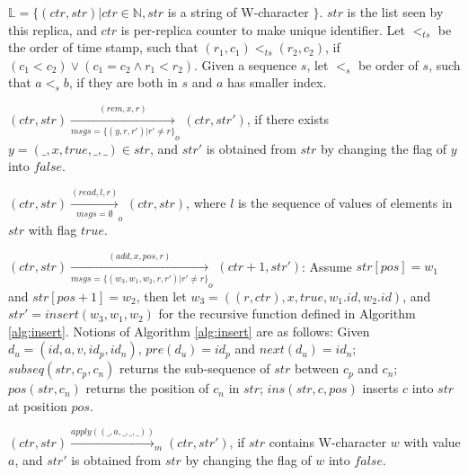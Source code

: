 \begin{itemize}
\setlength{\itemsep}{0.5pt}
\item[-] $\mathbb{L} = \{ (\mathit{ctr}, \mathit{str}) \vert \mathit{ctr} \in \mathbb{N}, \mathit{str}$ is a string of W-character $\}$. $\mathit{str}$ is the list seen by this replica, and $\mathit{ctr}$ is per-replica counter to make unique identifier. Let $<_{\mathit{ts}}$ be the order of time stamp, such that $(r_1,c_1) <_{\mathit{ts}} (r_2,c_2)$, if $(c_1 < c_2) \vee (c_1 = c_2 \wedge r_1 < r_2)$. Given a sequence $s$, let $<_s$ be order of $s$, such that $a <_s b$, if they are both in $s$ and $a$ has smaller index.

{\color {red}
\item[-] $(\mathit{ctr},\mathit{str}) \xrightarrow[\mathit{msgs} = \{ (y,r,r') \vert r' \neq r \}]{(\mathit{rem},x,r)}_o (\mathit{ctr},\mathit{str}')$, if there exists $y = (\_,x,\textit{true},\_,\_) \in \mathit{str}$, and $\mathit{str}'$ is obtained from $\mathit{str}$ by changing the flag of $y$ into $\mathit{false}$.

\item[-] $(\mathit{ctr},\mathit{str}) \xrightarrow[\mathit{msgs} = \emptyset]{(\mathit{read},l,r)}_o (\mathit{ctr},\mathit{str})$, where $l$ is the sequence of values of elements in $\mathit{str}$ with flag $\mathit{true}$.

\item[-] $(\mathit{ctr},\mathit{str}) \xrightarrow[\mathit{msgs} = \{ (w_3,w_1,w_2,r,r') \vert r' \neq r \}]{(\mathit{add},x,\mathit{pos},r)}_o (\mathit{ctr}+1,\mathit{str}')$: Assume $\mathit{str}[\mathit{pos}]=w_1$ and $\mathit{str}[\mathit{pos}+1]=w_2$, then let $w_3 = ((r,\mathit{ctr}),x,\mathit{true},w_1.\mathit{id},w_2.\mathit{id})$, and $\mathit{str}' = \mathit{insert}(w_3,w_1,w_2)$ for the recursive function defined in Algorithm \ref{alg:insert}. Notions of Algorithm \ref{alg:insert} are as follows: Given $d_u = (\mathit{id},a,v,\mathit{id}_p,\mathit{id}_n)$, $\mathit{pre}(d_u) = \mathit{id}_p$ and $\mathit{next}(d_u)=\mathit{id}_n$; $\mathit{subseq}(\mathit{str},c_p,c_n)$ returns the sub-sequence of $\mathit{str}$ between $c_p$ and $c_n$; $\mathit{pos}(\mathit{str},c_n)$ returns the position of $c_n$ in $\mathit{str}$; $\mathit{ins}(\mathit{str},c,\mathit{pos})$ inserts $c$ into $\mathit{str}$ at position $\mathit{pos}$.

\item[-] $(\mathit{ctr},\mathit{str}) \xrightarrow{\mathit{apply}((\_,a,\_,\_,\_))}_m (\mathit{ctr},\mathit{str}')$, if $\mathit{str}$ contains W-character $w$ with value $a$, and $\mathit{str}'$ is obtained from $\mathit{str}$ by changing the flag of $w$ into $\mathit{false}$.

}
\end{itemize}
